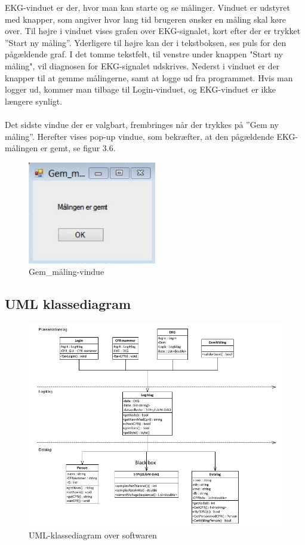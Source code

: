 EKG-vinduet er der, hvor man kan starte og se målinger. Vinduet er udstyret med knapper, som angiver hvor lang tid brugeren ønsker en måling skal køre over. Til højre i vinduet vises grafen over EKG-signalet, kort efter der er trykket ”Start ny måling”. Yderligere til højre kan der i tekstboksen, ses puls for den pågældende graf. I det tomme tekstfelt, til venstre under knappen "Start ny måling", vil diagnosen for EKG-signalet udskrives. Nederst i vinduet er der knapper til at gemme målingerne, samt at logge ud fra programmet. Hvis man logger ud, kommer man tilbage til Login-vinduet, og EKG-vinduet er ikke længere synligt. 
\\
\\
Det sidste vindue der er valgbart, frembringes når der trykkes på ”Gem ny måling”. Herefter vises pop-up vindue, som bekræfter, at den pågældende EKG-målingen er gemt, se figur 3.6. 

\begin{figure}[H]
	\centering
	\includegraphics[width=0.5\textwidth]{Figurer/Snip20150430_41}
	\caption{Gem\_måling-vindue}
\end{figure}

\subsection{UML klassediagram}

\begin{figure}[H]
	\centering
	\includegraphics[width=1\textwidth]{Figurer/Snip20150512_9}
	\caption{UML-klassediagram over softwaren}
\end{figure}

